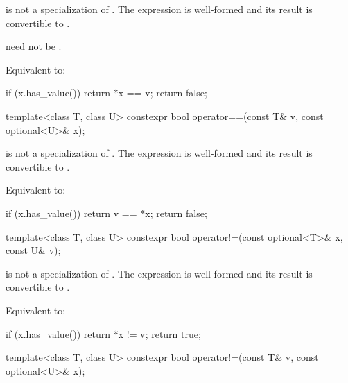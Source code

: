 \begin{itemdescr}
\pnum
\constraints
{} is not a specialization of .
The expression  is well-formed and
its result is convertible to .
\begin{note}
 need not be .
\end{note}

\pnum
\effects
Equivalent to:
\begin{codeblock}
if (x.has_value())
  return *x == v;
return false;
\end{codeblock}
\end{itemdescr}

%
\begin{itemdecl}
template<class T, class U> constexpr bool operator==(const T& v, const optional<U>& x);
\end{itemdecl}

\begin{itemdescr}
\pnum
\constraints
{} is not a specialization of .
The expression  is well-formed and
its result is convertible to .

\pnum
\effects
Equivalent to:
\begin{codeblock}
if (x.has_value())
  return v == *x;
return false;
\end{codeblock}
\end{itemdescr}

%
\begin{itemdecl}
template<class T, class U> constexpr bool operator!=(const optional<T>& x, const U& v);
\end{itemdecl}

\begin{itemdescr}
\pnum
\constraints
{} is not a specialization of .
The expression  is well-formed and
its result is convertible to .

\pnum
\effects
Equivalent to:
\begin{codeblock}
if (x.has_value())
  return *x != v;
return true;
\end{codeblock}
\end{itemdescr}

%
\begin{itemdecl}
template<class T, class U> constexpr bool operator!=(const T& v, const optional<U>& x);
\end{itemdecl}

